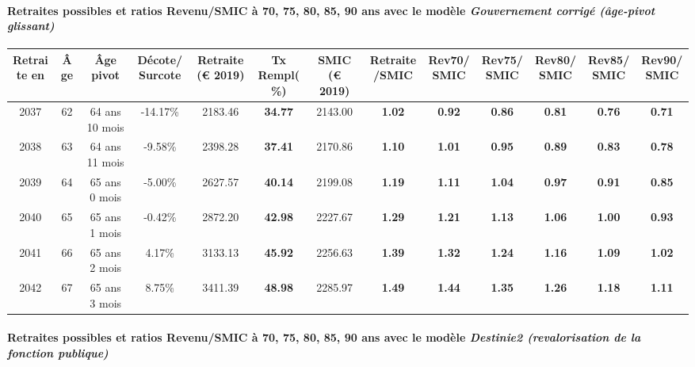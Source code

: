 \paragraph{Retraites possibles et ratios Revenu/SMIC à 70, 75, 80, 85, 90 ans avec le modèle \emph{Gouvernement corrigé (âge-pivot glissant)}}  
 
{ \scriptsize \begin{center} 
\begin{tabular}[htb]{|c|c||c|c||c|c||c||c|c|c|c|c|c|} 
\hline 
 Retraite en &  Âge &  Âge pivot &  Décote/Surcote &  Retraite (\euro{} 2019) &  Tx Rempl(\%) &  SMIC (\euro{} 2019) &  Retraite/SMIC &  Rev70/SMIC &  Rev75/SMIC &  Rev80/SMIC &  Rev85/SMIC &  Rev90/SMIC \\ 
\hline \hline 
 2037 &  62 &  64 ans 10 mois &  -14.17\% &  2183.46 &  {\bf 34.77} &  2143.00 &  {\bf 1.02} &  {\bf {\color{red} 0.92}} &  {\bf {\color{red} 0.86}} &  {\bf {\color{red} 0.81}} &  {\bf {\color{red} 0.76}} &  {\bf {\color{red} 0.71}} \\ 
\hline 
 2038 &  63 &  64 ans 11 mois &  -9.58\% &  2398.28 &  {\bf 37.41} &  2170.86 &  {\bf 1.10} &  {\bf 1.01} &  {\bf {\color{red} 0.95}} &  {\bf {\color{red} 0.89}} &  {\bf {\color{red} 0.83}} &  {\bf {\color{red} 0.78}} \\ 
\hline 
 2039 &  64 &  65 ans 0 mois &  -5.00\% &  2627.57 &  {\bf 40.14} &  2199.08 &  {\bf 1.19} &  {\bf 1.11} &  {\bf 1.04} &  {\bf {\color{red} 0.97}} &  {\bf {\color{red} 0.91}} &  {\bf {\color{red} 0.85}} \\ 
\hline 
 2040 &  65 &  65 ans 1 mois &  -0.42\% &  2872.20 &  {\bf 42.98} &  2227.67 &  {\bf 1.29} &  {\bf 1.21} &  {\bf 1.13} &  {\bf 1.06} &  {\bf {\color{red} 1.00}} &  {\bf {\color{red} 0.93}} \\ 
\hline 
 2041 &  66 &  65 ans 2 mois &  4.17\% &  3133.13 &  {\bf 45.92} &  2256.63 &  {\bf 1.39} &  {\bf 1.32} &  {\bf 1.24} &  {\bf 1.16} &  {\bf 1.09} &  {\bf 1.02} \\ 
\hline 
 2042 &  67 &  65 ans 3 mois &  8.75\% &  3411.39 &  {\bf 48.98} &  2285.97 &  {\bf 1.49} &  {\bf 1.44} &  {\bf 1.35} &  {\bf 1.26} &  {\bf 1.18} &  {\bf 1.11} \\ 
\hline 
\hline 
\end{tabular} 
\end{center} } 
\paragraph{Retraites possibles et ratios Revenu/SMIC à 70, 75, 80, 85, 90 ans avec le modèle \emph{Destinie2 (revalorisation de la fonction publique)}}  
 
